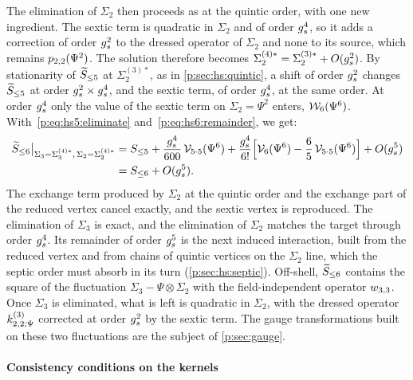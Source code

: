 The elimination of $\Sigma_2$ then proceeds as at the quintic order, with one new ingredient.
The sextic term is quadratic in $\Sigma_2$ and of order $\gs^4$, so it adds a correction of order $\gs^2$ to the dressed operator of $\Sigma_2$ and none to its source, which remains $\sprod{2}{2}(\Psi^2)$.
The solution therefore becomes $\Sigma_2^{(4)*} = \Sigma_2^{(3)*} + O(\gs^2)$.
By stationarity of $\caction[\le 5]$ at $\Sigma_2^{(3)*}$, as in \cref{p:sec:hs:quintic}, a shift of order $\gs^2$ changes $\caction[\le 5]$ at order $\gs^2 \times \gs^4$, and the sextic term, of order $\gs^4$, at the same order.
At order $\gs^4$ only the value of the sextic term on $\Sigma_2 = \Psi^2$ enters, $\dvertex{6}(\Psi^6)$.
With~\eqref{p:eq:hs5:eliminate} and~\eqref{p:eq:hs6:remainder}, we get:
\begin{equation}
  \label{p:eq:hs6:eliminate}
  \begin{aligned}
    \caction[\le 6] \big|_{\Sigma_3 = \Sigma_3^{(4)*}, \, \Sigma_2 = \Sigma_2^{(4)*}}
      &
      = S_{\le 5}
        + \frac{\gs^4}{600} \, \vertex{5 \cdot 5}(\Psi^6)
        + \frac{\gs^4}{6!} \Big[ \vertex{6}(\Psi^6) - \frac{6}{5} \, \vertex{5 \cdot 5}(\Psi^6) \Big]
        + O(\gs^5)
      \\ &
      = S_{\le 6} + O(\gs^5).
  \end{aligned}
\end{equation}
The exchange term produced by $\Sigma_2$ at the quintic order and the exchange part of the reduced vertex cancel exactly, and the sextic vertex is reproduced.
The elimination of $\Sigma_3$ is exact, and the elimination of $\Sigma_2$ matches the target through order $\gs^4$.
Its remainder of order $\gs^5$ is the next induced interaction, built from the reduced vertex and from chains of quintic vertices on the $\Sigma_2$ line, which the septic order must absorb in its turn (\cref{p:sec:hs:septic}).
Off-shell, $\caction[\le 6]$ contains the square of the fluctuation $\Sigma_3 - \Psi \otimes \Sigma_2$ with the field-independent operator $\wprod{3}{3}$.
Once $\Sigma_3$ is eliminated, what is left is quadratic in $\Sigma_2$, with the dressed operator $\kin{2}{\Psi}{3}$ corrected at order $\gs^2$ by the sextic term.
The gauge transformations built on these two fluctuations are the subject of \cref{p:sec:gauge}.


\paragraph{Consistency conditions on the kernels}
\label{p:sec:hs:sextic:kernel}

